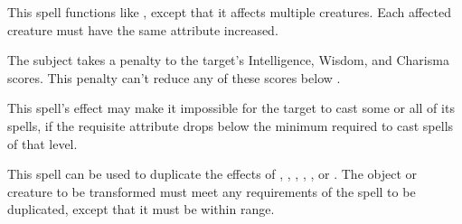 \spellrng{\rngmed}
\begin{spelleffect}
  This spell functions like , except that it affects multiple creatures. Each affected creature must have the same attribute increased. 
\end{spelleffect}

\spelldur{\durshort}
\begin{spelleffect}
   The subject takes a  penalty to the target's Intelligence, Wisdom, and Charisma scores. This penalty can't reduce any of these scores below .
\end{spelleffect}
\begin{spellnotes}
  This spell's effect may make it impossible for the target to cast some or all of its spells, if the requisite attribute drops below the minimum required to cast spells of that level.
\end{spellnotes}

\spellrng{\rngmed}
\begin{spelleffect}
  This spell can be used to duplicate the effects of , , , , , or . The object or creature to be transformed must meet any requirements of the spell to be duplicated, except that it must be within \rngmed range.
\end{spelleffect}

